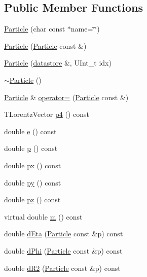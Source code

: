 \subsection*{Public Member Functions}
\begin{DoxyCompactItemize}
\item 
\hyperlink{classpanda_1_1Particle_a1e3d569b53827f47d15e104e06cca44f}{Particle} (char const $\ast$name=\char`\"{}\char`\"{})
\item 
\hyperlink{classpanda_1_1Particle_a1b85ffd9b05ca143d4ed762747fb2b50}{Particle} (\hyperlink{classpanda_1_1Particle}{Particle} const \&)
\item 
\hyperlink{classpanda_1_1Particle_aeca877b586da802e045c6ed2121240b5}{Particle} (\hyperlink{structpanda_1_1Element_1_1datastore}{datastore} \&, UInt\_\-t idx)
\item 
\hyperlink{classpanda_1_1Particle_a83e4d1aa75d0c1a125d0b6669bd28db5}{$\sim$Particle} ()
\item 
\hyperlink{classpanda_1_1Particle}{Particle} \& \hyperlink{classpanda_1_1Particle_a8c4fabfceb39b746b0e68a7389e662c4}{operator=} (\hyperlink{classpanda_1_1Particle}{Particle} const \&)
\item 
TLorentzVector \hyperlink{classpanda_1_1Particle_aab2f22a57738ea3b2d3226e72c150a99}{p4} () const 
\item 
double \hyperlink{classpanda_1_1Particle_a7e352dd288ae0065303e5adc1ff3ba69}{e} () const 
\item 
double \hyperlink{classpanda_1_1Particle_a581eab76794352c5908ef3e8e6d36a95}{p} () const 
\item 
double \hyperlink{classpanda_1_1Particle_a1df59522ef74ec3c533c328aea7f433d}{px} () const 
\item 
double \hyperlink{classpanda_1_1Particle_a6e8d9ffa8dc261f7b67b6e0c75ba8143}{py} () const 
\item 
double \hyperlink{classpanda_1_1Particle_adeb8bce6ddfe5429f3db5f0d6ee6e9b0}{pz} () const 
\item 
virtual double \hyperlink{classpanda_1_1Particle_aa793c05fc1334ed462e18c794339eebf}{m} () const 
\item 
double \hyperlink{classpanda_1_1Particle_a7216a6a830a5231aef8ebc7d57018699}{dEta} (\hyperlink{classpanda_1_1Particle}{Particle} const \&p) const 
\item 
double \hyperlink{classpanda_1_1Particle_ad58d76aa3509890401e7075d36d605b2}{dPhi} (\hyperlink{classpanda_1_1Particle}{Particle} const \&p) const 
\item 
double \hyperlink{classpanda_1_1Particle_a31b515f8bcd6d64227ec24dd4b9682c3}{dR2} (\hyperlink{classpanda_1_1Particle}{Particle} const \&p) const 

\end{DoxyCompactItemize}
